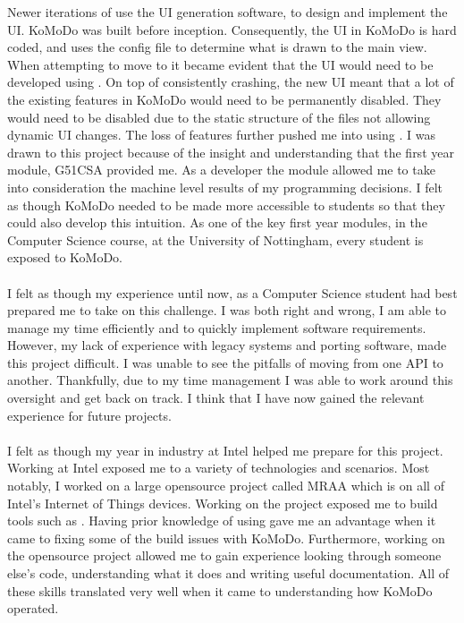 %
Newer iterations of  use the UI generation software,  to design and implement the UI. KoMoDo was built before  inception. Consequently, the UI in KoMoDo is hard coded, and uses the  config file to determine what is drawn to the main view. When attempting to move to  it became evident that the UI would need to be developed using . On top of  consistently crashing, the new UI meant that a lot of the existing features in KoMoDo would need to be permanently disabled. They would need to be disabled due to the static structure of the  files not allowing dynamic UI changes. The loss of features further pushed me into using .
%
%
%
%
I was drawn to this project because of the insight and understanding that the first year module, G51CSA provided me. As a developer the module allowed me to take into consideration the machine level results of my programming decisions. I felt as though KoMoDo needed to be made more accessible to students so that they could also develop this intuition. As one of the key first year modules, in the Computer Science course, at the University of Nottingham, every student is exposed to KoMoDo.\\\\
%
I felt as though my experience until now, as a Computer Science student had best prepared me to take on this challenge. I was both right and wrong, I am able to manage my time efficiently and to quickly implement software requirements. However, my lack of experience with legacy systems and porting software, made this project difficult. I was unable to see the pitfalls of moving from one API to another. Thankfully, due to my time management I was able to work around this oversight and get back on track. I think that I have now gained the relevant experience for future projects.\\\\
%
I felt as though my year in industry at Intel helped me prepare for this project. Working at Intel exposed me to a variety of technologies and scenarios. Most notably, I worked on a large opensource project called MRAA which is on all of Intel's Internet of Things devices. Working on the project exposed me to build tools such as . Having prior knowledge of using  gave me an advantage when it came to fixing some of the build issues with KoMoDo. Furthermore, working on the opensource project allowed me to gain experience looking through someone else's code, understanding what it does and writing useful documentation. All of these skills translated very well when it came to understanding how KoMoDo operated.\\\\
